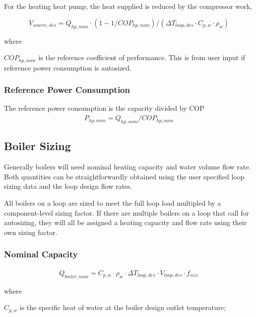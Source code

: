 For the heating heat pump, the heat supplied is reduced by the compressor work,

\begin{equation}
\dot V_{source,des} = \dot Q_{hp,nom} \cdot (1 - 1/COP_{hp,nom})/(\Delta T_{loop,des} \cdot C_{p,w} \cdot \rho_w)
\end{equation}

where

\( COP_{hp,nom} \) is the reference coefficient of performance.  This is from user input if reference power consumption is autosized.

\subsubsection{Reference Power Consumption}\label{wwhp-ref-power-consumption}

The reference power consumption is the capacity divided by COP
\begin{equation}
P_{hp,nom} = \dot Q_{hp,nom} / COP_{hp,nom}
\end{equation}

\subsection{Boiler Sizing}\label{boiler-sizing}

Generally boilers will need nominal heating capacity and water volume flow rate. Both quantities can be straightforwardly obtained using the user specified loop sizing data and the loop design flow rates.

All boilers on a loop are sized to meet the full loop load multipled by a component-level sizing factor. If there are multiple boilers on a loop that call for autosizing, they will all be assigned a heating capacity and flow rate using their own sizing factor.

\subsubsection{Nominal Capacity}\label{nominal-capacity}

\begin{equation}
\dot Q_{boiler,nom} = C_{p,w} \cdot \rho_w \cdot \Delta T_{loop,des} \cdot \dot V_{loop,des} \cdot f_{size}
\end{equation}

where

\( C_{p,w} \) is the specific heat of water at the boiler design outlet temperature;

